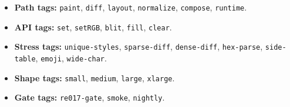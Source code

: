 \begin{itemize}
\tightlist
\item
  \textbf{Path tags:} \texttt{p\allowbreak{}a\allowbreak{}i\allowbreak{}n\allowbreak{}t}, \texttt{d\allowbreak{}i\allowbreak{}f\allowbreak{}f}, \texttt{l\allowbreak{}a\allowbreak{}y\allowbreak{}o\allowbreak{}u\allowbreak{}t}, \texttt{n\allowbreak{}o\allowbreak{}r\allowbreak{}m\allowbreak{}a\allowbreak{}l\allowbreak{}i\allowbreak{}z\allowbreak{}e}, \texttt{c\allowbreak{}o\allowbreak{}m\allowbreak{}p\allowbreak{}o\allowbreak{}s\allowbreak{}e}, \texttt{r\allowbreak{}u\allowbreak{}n\allowbreak{}t\allowbreak{}i\allowbreak{}m\allowbreak{}e}.
\item
  \textbf{API tags:} \texttt{s\allowbreak{}e\allowbreak{}t}, \texttt{s\allowbreak{}e\allowbreak{}t\allowbreak{}R\allowbreak{}G\allowbreak{}B}, \texttt{b\allowbreak{}l\allowbreak{}i\allowbreak{}t}, \texttt{f\allowbreak{}i\allowbreak{}l\allowbreak{}l}, \texttt{c\allowbreak{}l\allowbreak{}e\allowbreak{}a\allowbreak{}r}.
\item
  \textbf{Stress tags:} \texttt{u\allowbreak{}n\allowbreak{}i\allowbreak{}q\allowbreak{}u\allowbreak{}e\allowbreak{}-\allowbreak{}s\allowbreak{}t\allowbreak{}y\allowbreak{}l\allowbreak{}e\allowbreak{}s}, \texttt{s\allowbreak{}p\allowbreak{}a\allowbreak{}r\allowbreak{}s\allowbreak{}e\allowbreak{}-\allowbreak{}d\allowbreak{}i\allowbreak{}f\allowbreak{}f}, \texttt{d\allowbreak{}e\allowbreak{}n\allowbreak{}s\allowbreak{}e\allowbreak{}-\allowbreak{}d\allowbreak{}i\allowbreak{}f\allowbreak{}f}, \texttt{h\allowbreak{}e\allowbreak{}x\allowbreak{}-\allowbreak{}p\allowbreak{}a\allowbreak{}r\allowbreak{}s\allowbreak{}e}, \texttt{s\allowbreak{}i\allowbreak{}d\allowbreak{}e\allowbreak{}-\allowbreak{}t\allowbreak{}a\allowbreak{}b\allowbreak{}l\allowbreak{}e}, \texttt{e\allowbreak{}m\allowbreak{}o\allowbreak{}j\allowbreak{}i}, \texttt{w\allowbreak{}i\allowbreak{}d\allowbreak{}e\allowbreak{}-\allowbreak{}c\allowbreak{}h\allowbreak{}a\allowbreak{}r}.
\item
  \textbf{Shape tags:} \texttt{s\allowbreak{}m\allowbreak{}a\allowbreak{}l\allowbreak{}l}, \texttt{m\allowbreak{}e\allowbreak{}d\allowbreak{}i\allowbreak{}u\allowbreak{}m}, \texttt{l\allowbreak{}a\allowbreak{}r\allowbreak{}g\allowbreak{}e}, \texttt{x\allowbreak{}l\allowbreak{}a\allowbreak{}r\allowbreak{}g\allowbreak{}e}.
\item
  \textbf{Gate tags:} \texttt{r\allowbreak{}e\allowbreak{}0\allowbreak{}1\allowbreak{}7\allowbreak{}-\allowbreak{}g\allowbreak{}a\allowbreak{}t\allowbreak{}e}, \texttt{s\allowbreak{}m\allowbreak{}o\allowbreak{}k\allowbreak{}e}, \texttt{n\allowbreak{}i\allowbreak{}g\allowbreak{}h\allowbreak{}t\allowbreak{}l\allowbreak{}y}.
\end{itemize}

